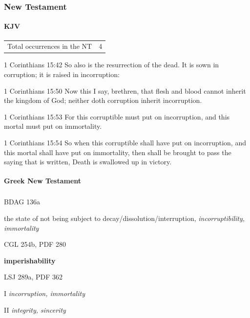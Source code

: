 	\subsubsection{New Testament} %
		\label{INCORRUPTION-NT}
	
		\paragraph{KJV}
			\label{INCORRUPTION-NT-KJV}
			
	
			\begin{tabular}{ll}
				Total occurrences in the NT & 4
			\end{tabular}
			
			\begin{compactdesc}
				\item[1 Corinthians 15:42] So also is the resurrection of the dead. It is sown in corruption; it is raised in incorruption:
				\item[1 Corinthians 15:50] Now this I say, brethren, that flesh and blood cannot inherit the kingdom of God; neither doth corruption inherit incorruption.
				\item[1 Corinthians 15:53] For this corruptible must put on incorruption, and this mortal must put on immortality.
				\item[1 Corinthians 15:54] So when this corruptible shall have put on incorruption, and this mortal shall have put on immortality, then shall be brought to pass the saying that is written, Death is swallowed up in victory.
			\end{compactdesc}
			
		\paragraph{Greek New Testament}
			\label{INCORRUPTION-GREEK}
		
			\subparagraph{\texorpdfstring{}{}}
				\label{APHTHARSIA}
			
				\begin{compactdesc}
					\item[BDAG 136a] \textbf{}
						\begin{compactitem}
							\item the state of not being subject to decay/dissolution/interruption, \textit{incorruptibility, immortality}
						\end{compactitem}
					\item[CGL 254b, PDF 280] \textbf{}
						\begin{compactitem}
							\item \textbf{imperishability}
						\end{compactitem}
					\item[LSJ 289a, PDF 362] \textbf{}
						\begin{compactitem}
							\item[I] \textit{incorruption, immortality}
							\item[II] \textit{integrity, sincerity}
						\end{compactitem}
				\end{compactdesc}
				
